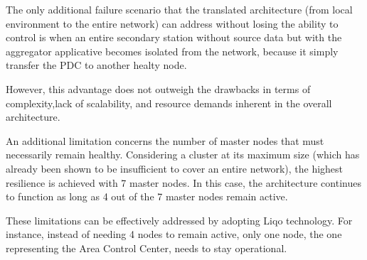 The only additional failure scenario that the translated architecture (from local environment to the entire network) can address without losing the ability to control is when an entire secondary station without source data but with the aggregator applicative becomes isolated from the network, because it simply transfer the PDC to another healty node.

However, this advantage does not outweigh the drawbacks in terms of complexity,lack of scalability, and resource demands inherent in the overall architecture. 

An additional limitation concerns the number of master nodes that must necessarily remain healthy. Considering a cluster at its maximum size (which has already been shown to be insufficient to cover an entire network), the highest resilience is achieved with 7 master nodes. In this case, the architecture continues to function as long as 4 out of the 7 master nodes remain active.

These limitations can be effectively addressed by adopting Liqo technology. For instance, instead of needing 4 nodes to remain active, only one node, the one representing the Area Control Center, needs to stay operational.